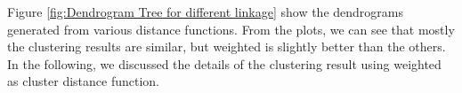 \documentclass[12pt,oneside,final]{vlsithesis}
\begin{document}
Figure \ref{fig:Dendrogram Tree for different linkage} show the dendrograms generated from various distance functions. From the plots, we can see that mostly the clustering results are similar, but weighted is slightly better than the others. In the following, we discussed the details of the clustering result using weighted as cluster distance function.
\begin{figure*}
	\centering
	\caption{Dendrogram Tree for different linkage}
	\label{fig:Dendrogram Tree for different linkage}
\end{figure*}
\end{document}

